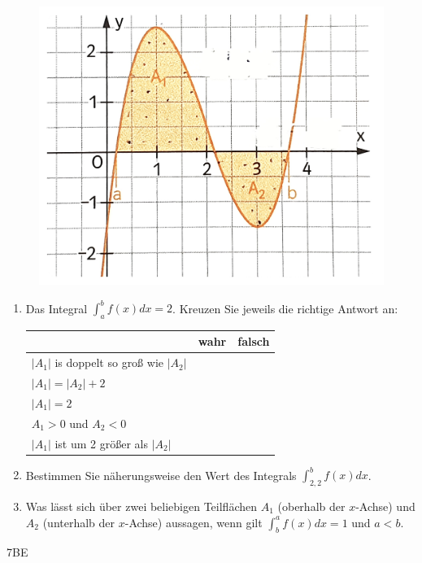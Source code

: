 \documentclass[a4paper,12pt]{article}
\begin{document}
\begin{figure}[h!]
  \centering
  \includegraphics[width=0.5\columnwidth]{Q12_2EX_Integral_1.jpg}
\end{figure}

\begin{enumerate}[label={\alph*)}]
  \item Das Integral $\int_{a}^{b}f(x)dx=2$. Kreuzen Sie jeweils die richtige Antwort an:\\
    \begin{tabular}{ p{7cm} | p{3cm} | p{3cm} | }
      \cline{2-3}
      \multicolumn{1}{c}{} & \multicolumn{1}{|c|}{wahr} & \multicolumn{1}{c|}{falsch} \\
      \hline
      \multicolumn{1}{|l|}{$|A_1|$ is doppelt so groß wie $|A_2|$} &  &  \\ \hline
      \multicolumn{1}{|l|}{$|A_1|=|A_2|+2$} & &  \\ \hline
      \multicolumn{1}{|l|}{$|A_1|=2$} & &  \\ \hline
      \multicolumn{1}{|l|}{$A_1>0$ und $A_2<0$} & &  \\ \hline
      \multicolumn{1}{|l|}{$|A_1|$ ist um 2 größer als $|A_2|$} & &  \\ \hline
    \end{tabular}

  \item Bestimmen Sie näherungsweise den Wert des Integrals $\int_{2,2}^{b} f(x)dx$.
  \item Was lässt sich über zwei beliebigen Teilflächen $A_1$ (oberhalb der $x$-Achse) und $A_2$ (unterhalb der $x$-Achse) aussagen, wenn gilt $\int_{b}^{a}f(x)dx=1$ und $a<b$.
\end{enumerate}
\begin{flushright}7BE \end{flushright}


\end{document}
